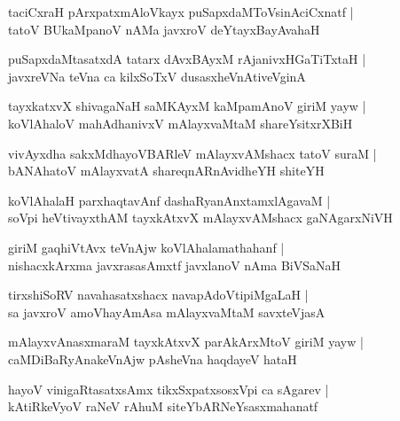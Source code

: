 \documentclass[twoside,12pt,openright]{book}
\newcounter{shloka}[chapter]
\begin{document}
\begin{shloka}%
taciCxraH pArxpatxmAloVkayx puSapxdaMToVsinAciCxnatf |\\
tatoV BUkaMpanoV nAMa javxroV deYtayxBayAvahaH 
\end{shloka}

\begin{shloka}%
puSapxdaMtasatxdA tatarx dAvxBAyxM rAjanivxHGaTiTxtaH |\\
javxreVNa teVna ca kilxSoTxV dusasxheVnAtiveVginA 
\end{shloka}

\begin{shloka}%
tayxkatxvX shivagaNaH saMKAyxM kaMpamAnoV giriM yayw |\\
koVlAhaloV mahAdhanivxV mAlayxvaMtaM shareYsitxrXBiH 
\end{shloka}

\begin{shloka}%
vivAyxdha sakxMdhayoVBARleV mAlayxvAMshacx tatoV suraM |\\
bANAhatoV mAlayxvatA shareqnARnAvidheYH shiteYH 
\end{shloka}

\begin{shloka}%
koVlAhalaH parxhaqtavAnf dashaRyanAnxtamxlAgavaM |\\
soVpi heVtivayxthAM tayxkAtxvX mAlayxvAMshacx gaNAgarxNiVH 
\end{shloka}

\begin{shloka}%
giriM gaqhiVtAvx teVnAjw koVlAhalamathahanf |\\
nishacxkArxma javxrasasAmxtf javxlanoV nAma BiVSaNaH 
\end{shloka}

\begin{shloka}%
tirxshiSoRV navahasatxshacx navapAdoVtipiMgaLaH |\\
sa javxroV amoVhayAmAsa mAlayxvaMtaM savxteVjasA 
\end{shloka}

\begin{shloka}%
mAlayxvAnasxmaraM tayxkAtxvX parAkArxMtoV giriM yayw |\\
caMDiBaRyAnakeVnAjw pAsheVna haqdayeV hataH 
\end{shloka}

\begin{shloka}%
hayoV vinigaRtasatxsAmx tikxSxpatxsosxVpi ca sAgarev |\\
kAtiRkeVyoV raNeV rAhuM siteYbARNeYsasxmahanatf 
\end{shloka}
\end{document}
